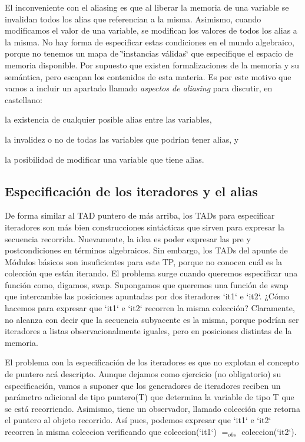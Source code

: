 \-El inconveniente con el aliasing es que al liberar la memoria de una variable se invalidan todos los alias que referencian a la misma. \-Asimismo, cuando modificamos el valor de una variable, se modifican los valores de todos los alias a la misma. \-No hay forma de especificar estas condiciones en el mundo algebraico, porque no tenemos un mapa de \char`\"{}instancias válidas\char`\"{} que especifique el espacio de memoria disponible. \-Por supuesto que existen formalizaciones de la memoria y su semántica, pero escapan los contenidos de esta materia. \-Es por este motivo que vamos a incluir un apartado llamado {\itshape aspectos de aliasing\/} para discutir, en castellano\-:
\begin{DoxyItemize}
\item la existencia de cualquier posible alias entre las variables,
\item la invalidez o no de todas las variables que podrían tener alias, y
\item la posibilidad de modificar una variable que tiene alias.
\end{DoxyItemize}\hypertarget{Aliasing_sec-iteradores}{}\subsection{\-Especificación de los iteradores y el alias}\label{Aliasing_sec-iteradores}
\-De forma similar al \-T\-A\-D puntero de más arriba, los \-T\-A\-Ds para especificar iteradores son más bien construcciones sintácticas que sirven para expresar la secuencia recorrida. \-Nuevamente, la idea es poder expresar las pre y postcondiciones en términos algebraicos. \-Sin embargo, los \-T\-A\-Ds del apunte de \-Módulos básicos son insuficientes para este \-T\-P, porque no conocen cuál es la colección que están iterando. \-El problema surge cuando queremos especificar una función como, digamos, swap. \-Supongamos que queremos una función de swap que intercambie las posiciones apuntadas por dos iteradores `it1` e `it2`. ¿\-Cómo hacemos para expresar que `it1` e `it2` recorren la misma colección? \-Claramente, no alcanza con decir que la secuencia subyacente es la misma, porque podrían ser iteradores a listas observacionalmente iguales, pero en posiciones distintas de la memoria.

\-El problema con la especificación de los iteradores es que no explotan el concepto de puntero acá descripto. \-Aunque dejamos como ejercicio (no obligatorio) su especificación, vamos a suponer que los generadores de iteradores reciben un parámetro adicional de tipo puntero(\-T) que determina la variable de tipo \-T que se está recorriendo. \-Asimismo, tiene un observador, llamado colección que retorna el puntero al objeto recorrido. \-Así pues, podemos expresar que `it1` e `it2` recorren la misma coleccion verificando que coleccion(`it1`) $=_{obs}$ coleccion(`it2`). 